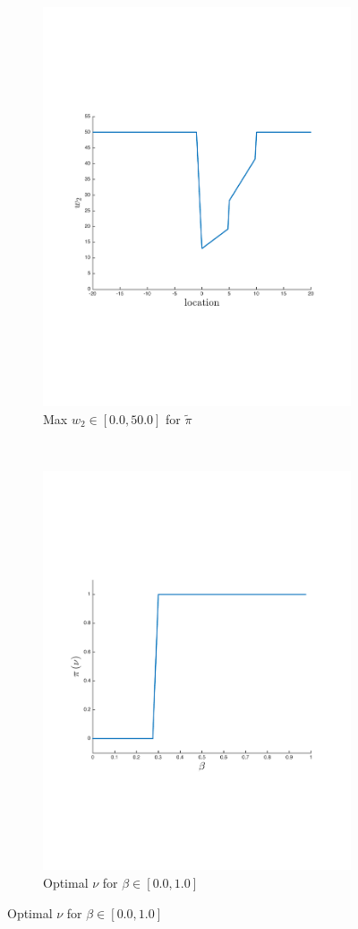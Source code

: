 {\centering
    \begin{figure}[ht]
            \begin{subfigure}{\columnwidth}
                \centering
                \includegraphics[width=0.55\columnwidth]{images/robot_opt_new}
                \caption{Max {\footnotesize $w_2 \in \left[0.0, 50.0 \right]$} for $ \tilde{\pi} $}\label{fig:navigation_opt}
            \end{subfigure}\\            
            \begin{subfigure}{\columnwidth}
                \centering
                \includegraphics[width=0.55\columnwidth]{images/sir_opt_new}
                \caption{Optimal {\footnotesize $ \nu $} for {\footnotesize $ \beta \in \left[ 0.0, 1.0 \right] $}}\label{fig:sir_opt}

\end{subfigure}
\end{figure}}
